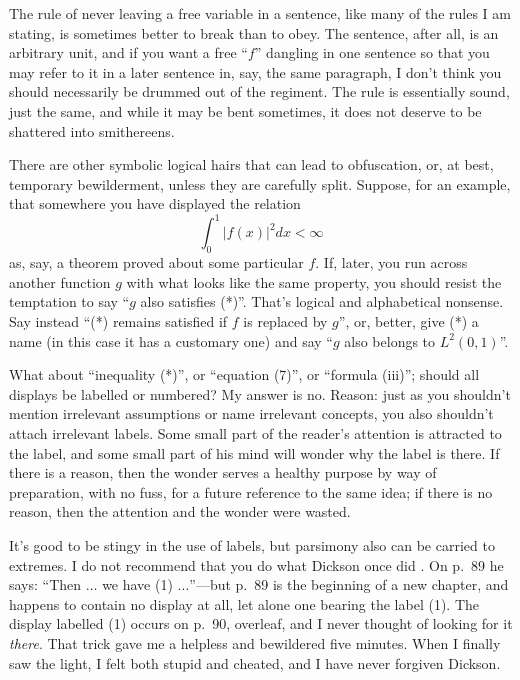 \documentclass[12pt]{article}
\begin{document}
The rule of never leaving a free variable in a sentence, like many of the rules I am stating, is sometimes better to break than to obey. The sentence, after all, is an arbitrary unit, and if you want a free ``$f$'' dangling in one sentence so that you may refer to it in a later sentence in, say, the same paragraph, I don't think you should necessarily be drummed out of the regiment. The rule is essentially sound, just the same, and while it may be bent sometimes, it does not deserve to be shattered into smithereens. 

There are other symbolic logical hairs that can lead to obfuscation, or, at best, temporary bewilderment, unless they are carefully split. Suppose, for an example, that somewhere you have displayed the relation 
\begin{equation} 
    \int_{0}^{1}|f(x)|^{2}dx<\infty \tag{*}
\end{equation}
as, say, a theorem proved about some particular $f$. If, later, you run across another function $g$ with what looks like the same property, you should resist the temptation to say ``$g$ also satisfies (*)''. That's logical and alphabetical nonsense. Say instead ``(*) remains satisfied if $f$ is replaced by $g$'', or, better, give (*) a name (in this case it has a customary one) and say ``$g$ also belongs to $L^{2}(0,1)$''. 

What about ``inequality (*)'', or ``equation (7)'', or ``formula (iii)''; should all displays be labelled or numbered? My answer is no. Reason: just as you shouldn't mention irrelevant assumptions or name irrelevant concepts, you also shouldn't attach irrelevant labels. Some small part of the reader's attention is attracted to the label, and some small part of his mind will wonder why the label is there. If there is a reason, then the wonder serves a healthy purpose by way of preparation, with no fuss, for a future reference to the same idea; if there is no reason, then the attention and the wonder were wasted. 

It's good to be stingy in the use of labels, but parsimony also can be carried to extremes. I do not recommend that you do what Dickson once did \cite{dickson1926modern}. On p.~89 he says: ``Then $\dots$ we have (1) $\dots$''---but p.~89 is the beginning of a new chapter, and happens to contain no display at all, let alone one bearing the label (1). The display labelled (1) occurs on p.~90, overleaf, and I never thought of looking for it \emph{there}. That trick gave me a helpless and bewildered five minutes. When I finally saw the light, I felt both stupid and cheated, and I have never forgiven Dickson. 
\end{document}
